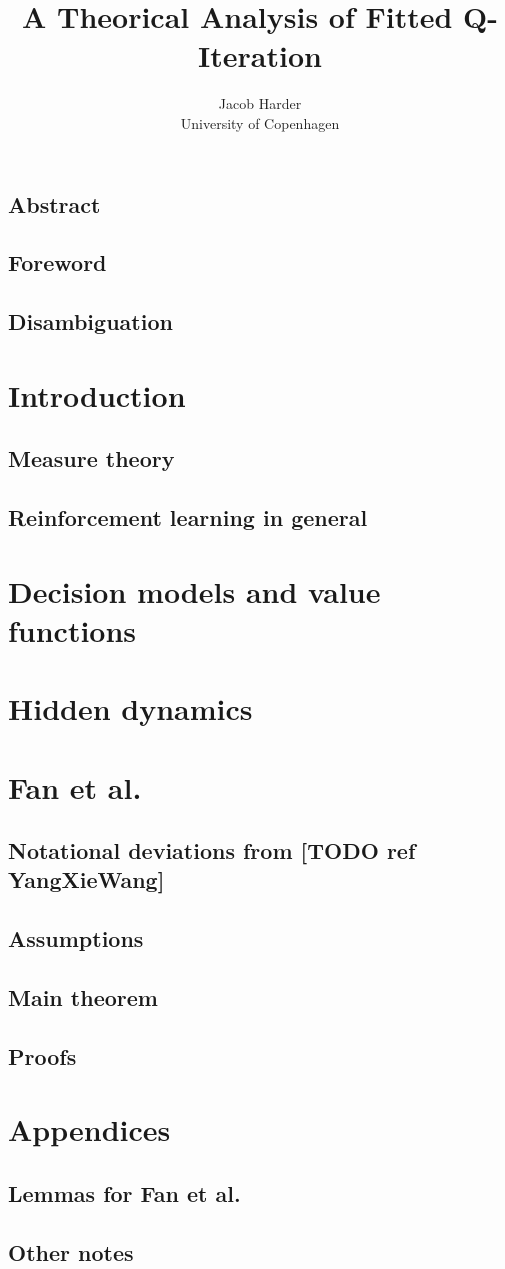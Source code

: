 \documentclass{article}
\title{A Theorical Analysis of Fitted Q-Iteration}
\author{Jacob Harder \\ University of Copenhagen}
\begin{document}
\maketitle

\subsection{Abstract}
\subsection{Foreword}

\subsection{Disambiguation}

\section{Introduction}


\subsection{Measure theory}

\subsection{Reinforcement learning in general}

\section{Decision models and value functions}

\section{Hidden dynamics}

\section{Fan et al.}
\subsection{Notational deviations from [TODO ref YangXieWang]}

\subsection{Assumptions}

\subsection{Main theorem}

\subsection{Proofs}





\section{Appendices}
\subsection{Lemmas for Fan et al.}

\subsection{Other notes}

\end{document}

